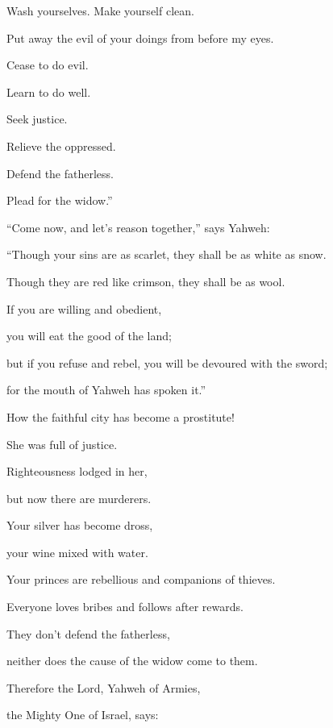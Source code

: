 {\par }{\Q {}Wash yourselves. Make yourself clean.
\par }{\QB Put away the evil of your doings from before my eyes.
\par }{\QB Cease to do evil.
\par }{\Q {}Learn to do well.
\par }{\QB Seek justice.
\par }{\QB Relieve the oppressed.
\par }{\Q Defend the fatherless.
\par }{\QB Plead for the widow.”
\par }{\BB \par }{\Q {}“Come now, and let’s reason together,” says Yahweh:
\par }{\QB “Though your sins are as scarlet, they shall be as white as snow.
\par }{\QB Though they are red like crimson, they shall be as wool.
\par }{\Q {}If you are willing and obedient,
\par }{\QB you will eat the good of the land;
\par }{\QB {}but if you refuse and rebel, you will be devoured with the sword;
\par }{\QB for the mouth of Yahweh has spoken it.”
\par }{\BB \par }{\Q {}How the faithful city has become a prostitute!
\par }{\QB She was full of justice.
\par }{\Q Righteousness lodged in her,
\par }{\QB but now there are murderers.
\par }{\Q {}Your silver has become dross,
\par }{\QB your wine mixed with water.
\par }{\Q {}Your princes are rebellious and companions of thieves.
\par }{\QB Everyone loves bribes and follows after rewards.
\par }{\QB They don’t defend the fatherless,
\par }{\QB neither does the cause of the widow come to them.
\par }{\BB \par }{\Q {}Therefore the Lord, Yahweh of Armies,
\par }{\QB the Mighty One of Israel, says:
}

